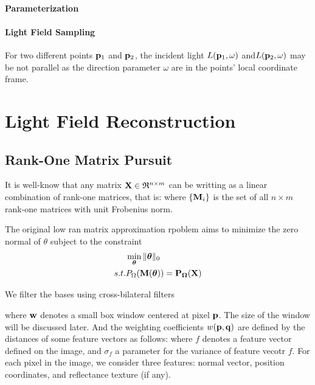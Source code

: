 \documentclass[review]{acmsiggraph}
\begin{document}
\paragraph{Parameterization}


\paragraph{Light Field Sampling}
For two different points ${\bf p}_1$ and ${\bf p}_2$, the incident light $L({\bf p}_1,\omega)$ and$L({\bf p}_2,\omega)$ may be not parallel as the direction parameter $\omega$ are in the points' local coordinate frame.

\section{Light Field Reconstruction}

\subsection{Rank-One Matrix Pursuit}

It is well-know that any matrix ${\bf X}\in\mathfrak{R}^{n\times m}$ can be writting as a linear combination of rank-one matrices, that is:
where $\{ {\bf M}_i\}$ is the set of all $n\times m$ rank-one matrices with unit Frobenius norm.

The original low ran matrix approximation rpoblem aims to minimize the zero normal of $\theta$ subject to the constraint
\begin{eqnarray}
	& \min_{\boldsymbol\theta} \|\boldsymbol\theta\|_0 \\
	s.t. & P_\Omega(\bf M(\boldsymbol\theta)) = P_\Omega(\bf X)
\end{eqnarray}

We filter the bases using cross-bilateral filters

where $\bf w$ denotes a small box window centered at pixel ${\bf p}$. The size of the window will be discussed later.  And the weighting coefficients $w({\bf p},{\bf q})$ are defined by the distances of some feature vectors as follows:
where $f$ denotes a feature vector defined on the image, and $\sigma_f$ a parameter for the variance of feature vecotr $f$. For each pixel in the image, we consider three features: normal vector, position coordinates, and reflectance texture (if any). 
\end{document}

